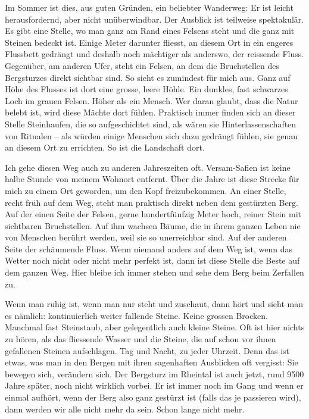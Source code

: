\documentclass[a4paper,
fontsize=11pt,
oneside,
numbers=noperiodatend,
parskip=half-,
bibliography=totoc,
final
]{scrartcl}
\begin{document}
Im Sommer ist dies, aus guten Gründen, ein beliebter Wanderweg: Er ist
leicht herausfordernd, aber nicht unüberwindbar. Der Ausblick ist
teilweise spektakulär. Es gibt eine Stelle, wo man ganz am Rand eines
Felsens steht und die ganz mit Steinen bedeckt ist. Einige Meter
darunter fliesst, an diesem Ort in ein engeres Flussbett gedrängt und
deshalb noch mächtiger als anderswo, der reissende Fluss. Gegenüber, am
anderen Ufer, steht ein Felsen, an dem die Bruchstellen des Bergsturzes
direkt sichtbar sind. So sieht es zumindest für mich aus. Ganz auf Höhe
des Flusses ist dort eine grosse, leere Höhle. Ein dunkles, fast
schwarzes Loch im grauen Felsen. Höher als ein Mensch. Wer daran glaubt,
dass die Natur belebt ist, wird diese Mächte dort fühlen. Praktisch
immer finden sich an dieser Stelle Steinhaufen, die so aufgeschichtet
sind, als wären sie Hinterlassenschaften von Ritualen -- als würden
einige Menschen sich dazu gedrängt fühlen, sie genau an diesem Ort zu
errichten. So ist die Landschaft dort.

Ich gehe diesen Weg auch zu anderen Jahreszeiten oft. Versam-Safien ist
keine halbe Stunde von meinem Wohnort entfernt. Über die Jahre ist diese
Strecke für mich zu einem Ort geworden, um den Kopf freizubekommen. An
einer Stelle, recht früh auf dem Weg, steht man praktisch direkt neben
dem gestürzten Berg. Auf der einen Seite der Felsen, gerne
hundertfünfzig Meter hoch, reiner Stein mit sichtbaren Bruchstellen. Auf
ihm wachsen Bäume, die in ihrem ganzen Leben nie von Menschen berührt
werden, weil sie so unerreichbar sind. Auf der anderen Seite der
schäumende Fluss. Wenn niemand anders auf dem Weg ist, wenn das Wetter
noch nicht oder nicht mehr perfekt ist, dann ist diese Stelle die Beste
auf dem ganzen Weg. Hier bleibe ich immer stehen und sehe dem Berg beim
Zerfallen zu.

Wenn man ruhig ist, wenn man nur steht und zuschaut, dann hört und sieht
man es nämlich: kontinuierlich weiter fallende Steine. Keine grossen
Brocken. Manchmal fast Steinstaub, aber gelegentlich auch kleine Steine.
Oft ist hier nichts zu hören, als das fliessende Wasser und die Steine,
die auf schon vor ihnen gefallenen Steinen aufschlagen. Tag und Nacht,
zu jeder Uhrzeit. Denn das ist etwas, was man in den Bergen mit ihren
sagenhaften Ausblicken oft vergisst: Sie bewegen sich, verändern sich.
Der Bergsturz im Rheintal ist auch jetzt, rund 9500 Jahre später, noch
nicht wirklich vorbei. Er ist immer noch im Gang und wenn er einmal
aufhört, wenn der Berg also ganz gestürzt ist (falls das je passieren
wird), dann werden wir alle nicht mehr da sein. Schon lange nicht mehr.
\end{document}

